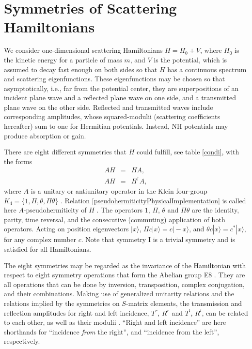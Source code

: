 %
%
%
\section{Symmetries of Scattering Hamiltonians\label{ssh}}
%
%
We consider one-dimensional  scattering Hamiltonians  $H=H_0+V$, where $H_{0}$
is the kinetic energy for a particle of mass $m$,
and
$V$ is the  potential, which is assumed to decay fast enough on both sides so that $H$ has a continuous spectrum and scattering eigenfunctions. These eigenfunctions may be chosen so that asymptotically, i.e., far from the potential center,  they are superpositions of an incident plane wave and a reflected plane wave on one side, and a transmitted plane wave on the other side. Reflected and transmitted waves include corresponding amplitudes, whose squared-modulii
(scattering coefficients hereafter) sum to one for Hermitian potentials. Instead, NH potentials
may produce  absorption or gain.


There are eight different symmetries that $H$ could fulfill, see table \ref{condi},
with the forms
%
\begin{eqnarray}
	AH&=&HA,
	\\
	AH&=&H^{\dagger}A,
	\label{pseudohermiticityPhysicalImplementation}
\end{eqnarray}
%
%
where $A$ is a unitary or antiunitary operator in the Klein four-group \linebreak $K_{4}=\lbrace 1,\Pi,\theta,\Pi\theta \rbrace$ \cite{Ruschhaupt2017}.
Relation \eqref{pseudohermiticityPhysicalImplementation} is called here $A$-pseudohermiticity of $H$ \cite{Mostafazadeh2010,Ruschhaupt2017}.
The operators $1$, $\Pi$, $\theta$ and $\Pi\theta$ are the identity, parity, time reversal,
and the consecutive (commuting) application of both operators.
Acting on position eigenvectors $|x\rangle$,
$\Pi c|x\rangle =c|-x\rangle$, and $\theta c |x\rangle = c^* |x\rangle$, for any  complex number $c$. Note that symmetry I is a trivial symmetry and is satisfied for all Hamiltonians.

%
The eight symmetries  may be regarded as the invariance of the Hamiltonian with respect to
eight symmetry operations that form the Abelian group E8 \cite{Simon2019a}. They are all operations that can be done by inversion, transposition, complex conjugation, and their combinations.
Making use of generalized unitarity relations and  the relations implied by the symmetries on $S$-matrix elements,
the transmission and reflection amplitudes for right and left incidence, $T^r$, $R^r$ and $T^l$, $R^l$, can be  related
to each other,
as well as their modulii \cite{Ruschhaupt2017}.  ``Right and left  incidence'' are here shorthands for ``incidence {\it from} the right'',
and ``incidence { from} the left'', respectively.

